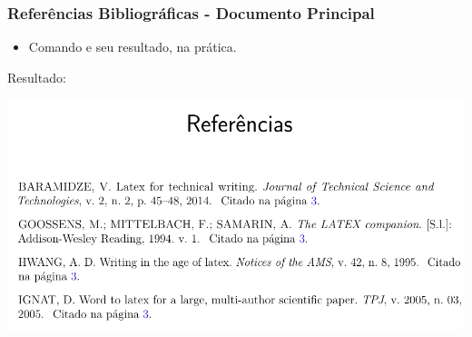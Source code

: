 \documentclass{beamer}
\begin{document}
	\begin{frame}[fragile]
	  \frametitle{Referências Bibliográficas - Documento Principal}
	  \begin{itemize}
	  \item Comando \verb__ e seu resultado, na prática.
	  \end{itemize}
	\begin{center}
	  Resultado: \\
          \vspace{0.4cm}

	  \includegraphics[scale=0.30]{../Imagens/A2I121.png}
	\end{center}
	\end{frame}








	
\end{document}
